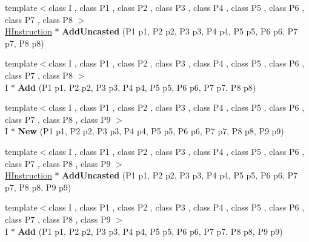 \begin{DoxyCompactItemize}
\item 
{\footnotesize template$<$class I , class P1 , class P2 , class P3 , class P4 , class P5 , class P6 , class P7 , class P8 $>$ }\\\hyperlink{classv8_1_1internal_1_1_h_instruction}{H\+Instruction} $\ast$ {\bfseries Add\+Uncasted} (P1 p1, P2 p2, P3 p3, P4 p4, P5 p5, P6 p6, P7 p7, P8 p8)\hypertarget{classv8_1_1internal_1_1_h_graph_builder_aeaea143dd1e7af96ea1fc5dea0ebdf76}{}\label{classv8_1_1internal_1_1_h_graph_builder_aeaea143dd1e7af96ea1fc5dea0ebdf76}

\item 
{\footnotesize template$<$class I , class P1 , class P2 , class P3 , class P4 , class P5 , class P6 , class P7 , class P8 $>$ }\\I $\ast$ {\bfseries Add} (P1 p1, P2 p2, P3 p3, P4 p4, P5 p5, P6 p6, P7 p7, P8 p8)\hypertarget{classv8_1_1internal_1_1_h_graph_builder_a4a93858e92e98389a959d17e23eeb973}{}\label{classv8_1_1internal_1_1_h_graph_builder_a4a93858e92e98389a959d17e23eeb973}

\item 
{\footnotesize template$<$class I , class P1 , class P2 , class P3 , class P4 , class P5 , class P6 , class P7 , class P8 , class P9 $>$ }\\I $\ast$ {\bfseries New} (P1 p1, P2 p2, P3 p3, P4 p4, P5 p5, P6 p6, P7 p7, P8 p8, P9 p9)\hypertarget{classv8_1_1internal_1_1_h_graph_builder_a95d36fb97b7109a8b96178d76e901095}{}\label{classv8_1_1internal_1_1_h_graph_builder_a95d36fb97b7109a8b96178d76e901095}

\item 
{\footnotesize template$<$class I , class P1 , class P2 , class P3 , class P4 , class P5 , class P6 , class P7 , class P8 , class P9 $>$ }\\\hyperlink{classv8_1_1internal_1_1_h_instruction}{H\+Instruction} $\ast$ {\bfseries Add\+Uncasted} (P1 p1, P2 p2, P3 p3, P4 p4, P5 p5, P6 p6, P7 p7, P8 p8, P9 p9)\hypertarget{classv8_1_1internal_1_1_h_graph_builder_a9141ecc84b3190b835fc93bf51c683cf}{}\label{classv8_1_1internal_1_1_h_graph_builder_a9141ecc84b3190b835fc93bf51c683cf}

\item 
{\footnotesize template$<$class I , class P1 , class P2 , class P3 , class P4 , class P5 , class P6 , class P7 , class P8 , class P9 $>$ }\\I $\ast$ {\bfseries Add} (P1 p1, P2 p2, P3 p3, P4 p4, P5 p5, P6 p6, P7 p7, P8 p8, P9 p9)\hypertarget{classv8_1_1internal_1_1_h_graph_builder_a857687e356fdf3ee42235ebdb9d6748f}{}\label{classv8_1_1internal_1_1_h_graph_builder_a857687e356fdf3ee42235ebdb9d6748f}


\end{DoxyCompactItemize}
